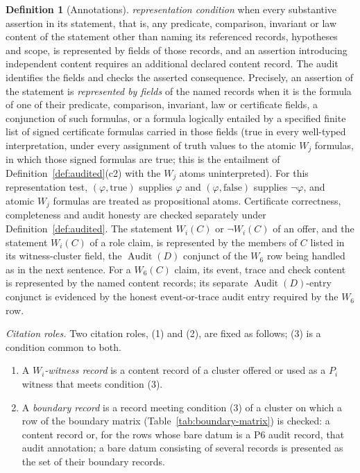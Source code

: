 \documentclass[11pt]{article}
\theoremstyle{definition}
\newtheorem{definition}[theorem]{Definition}
\newcommand{\Audit}[1]{\ensuremath{\operatorname{Audit}\!\left(#1\right)}}
\newcommand{\Psix}{\ensuremath{\mathrm{P6}}}
\begin{document}
\begin{definition}[Annotations]
\emph{representation condition} when every substantive assertion in its
statement, that is, any predicate, comparison, invariant or law content of the
statement other than naming its referenced records, hypotheses and scope, is
represented by fields of those records, and an assertion
introducing independent content requires an additional declared content
record. The audit identifies the fields and checks the asserted consequence.
Precisely, an assertion of the statement is \emph{represented by fields} of the
named records when it is the formula of one of their predicate, comparison,
invariant, law or certificate fields, a conjunction of such formulas, or a
formula logically entailed by a specified finite list of signed certificate
formulas carried in those fields (true in every well-typed interpretation, under every assignment of truth values to the atomic \(W_j\) formulas, in which those signed formulas are true; this is the entailment of Definition~\ref{def:audited}(c2) with the \(W_j\) atoms uninterpreted). For this representation test,
\((\varphi,\mathrm{true})\) supplies \(\varphi\) and
\((\varphi,\mathrm{false})\) supplies \(\neg\varphi\), and atomic \(W_j\)
formulas are treated as propositional atoms. Certificate correctness,
completeness and audit honesty are checked separately under
Definition~\ref{def:audited}. The statement \(W_i(C)\) or \(\neg W_i(C)\) of an
offer, and the statement \(W_i(C)\) of a role claim, is represented by the
members of \(C\) listed in its witness-cluster field, the \(\Audit{D}\) conjunct
of the \(W_6\) row being handled as in the next sentence.
For a \(W_6(C)\) claim, its event, trace and check content is represented by
the named content records; its separate \(\Audit{D}\)-entry conjunct is
evidenced by the honest event-or-trace audit entry required by the \(W_6\)
row.
\par\emph{Citation roles.} Two citation roles, (1) and (2), are fixed as follows; (3) is a condition common to both.
\begin{enumerate}[label=(\arabic*),topsep=2pt,itemsep=1pt]
  \item A \emph{\(W_i\)-witness record} is a content record of a cluster offered or used as a \(P_i\) witness that meets condition (3).
  \item A \emph{boundary record} is a record meeting condition (3) of a cluster on which a row of the boundary matrix (Table~\ref{tab:boundary-matrix}) is checked: a content record or, for the rows whose bare datum is a \Psix{} audit record, that audit annotation; a bare datum consisting of several records is presented as the set of their boundary records.

\end{enumerate}
\end{definition}
\end{document}
